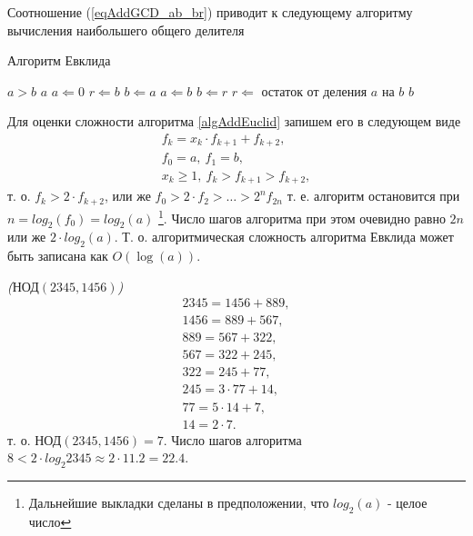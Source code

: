 Соотношение (\ref{eqAddGCD_ab_br}) приводит к следующему алгоритму
вычисления наибольшего общего делителя
\begin{algorithm}
\caption{Алгоритм Евклида}
\begin{algorithmic}
    \STATE $a > b$
        \RETURN $a$
    \ENDIF
    \STATE $a \Leftarrow 0$
    \STATE $r \Leftarrow b$
    \STATE $b \Leftarrow a$
    \REPEAT
        \STATE $a \Leftarrow b$
        \STATE $b \Leftarrow r$
        \STATE $r \Leftarrow $ остаток от деления $a$ на $b$
    \RETURN $b$
\end{algorithmic}
\label{algAddEuclid}
\end{algorithm}

Для оценки сложности алгоритма \ref{algAddEuclid} запишем его в
следующем виде 
\begin{eqnarray}
f_k = x_k \cdot f_{k + 1} + f_{k + 2},
\nonumber \\
f_0 = a, \: f_1 = b,
\nonumber \\
x_k \ge 1, \: f_k > f_{k+1} > f_{k + 2},
\nonumber
\end{eqnarray}
т. о. $f_k > 2 \cdot f_{k + 2}$, или же 
$f_0 > 2 \cdot f_2 > \dots > 2^nf_{2n}$ т. е. алгоритм остановится при
$n = log_2\left(f_0\right) = log_2\left(a\right)$
\footnote{Дальнейшие выкладки сделаны в предположении, что
  $log_2\left(a\right)$ - целое число}. Число шагов
алгоритма при этом очевидно равно $2n$ или же 
$2 \cdot log_2\left(a\right)$. Т. о. алгоритмическая сложность
алгоритма Евклида может быть записана как 
$O\left(\log \left(a\right)\right)$.


\begin{example}
\emph{($\mbox{НОД}\left(2345,1456\right)$)}
\begin{eqnarray}
2345 = 1456 + 889,
\nonumber \\
1456 = 889 + 567,
\nonumber \\
889 = 567 + 322,
\nonumber \\
567 = 322 + 245,
\nonumber \\
322 = 245 + 77,
\nonumber \\
245 = 3 \cdot 77 + 14,
\nonumber \\
77 = 5 \cdot 14 + 7,
\nonumber \\
14 = 2 \cdot 7.
\nonumber
\end{eqnarray}
т. о. $\mbox{НОД}\left(2345,1456\right) = 7$. 
Число шагов алгоритма  $8 < 2 \cdot log_2{2345} \approx 2 \cdot 11.2 = 22.4$.
\nonumber
\end{example}
